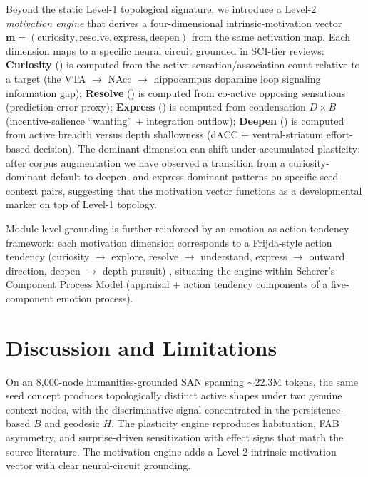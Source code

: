 \documentclass{article}
\begin{document}
Beyond the static Level-1 topological signature, we introduce a Level-2
\emph{motivation engine} that derives a four-dimensional intrinsic-motivation
vector $\mathbf{m} = (\mathrm{curiosity}, \mathrm{resolve},
\mathrm{express}, \mathrm{deepen})$ from the same activation map. Each
dimension maps to a specific neural circuit grounded in SCI-tier reviews:
\textbf{Curiosity} (\cite{gruber2014states,berlyne1960conflict}) is computed
from the active sensation/association count relative to a target (the VTA
$\to$ NAcc $\to$ hippocampus dopamine loop signaling information gap);
\textbf{Resolve} (\cite{schultz2016dopamine,friston2010free}) is computed
from co-active opposing sensations (prediction-error proxy);
\textbf{Express} (\cite{berridge2025incentive,tononi2008qualia}) is computed
from condensation $D \times B$ (incentive-salience ``wanting'' + integration
outflow); \textbf{Deepen}
(\cite{husain2018neuroscience,costello2024apathy}) is computed from active
breadth versus depth shallowness (dACC + ventral-striatum effort-based
decision). The dominant dimension can shift under accumulated plasticity:
after corpus augmentation we have observed a transition from a curiosity-
dominant default to deepen- and express-dominant patterns on specific
seed-context pairs, suggesting that the motivation vector functions as a
developmental marker on top of Level-1 topology.

Module-level grounding is further reinforced by an
emotion-as-action-tendency framework: each motivation dimension corresponds
to a Frijda-style action tendency (curiosity $\to$ explore, resolve $\to$
understand, express $\to$ outward direction, deepen $\to$ depth pursuit)
\cite{frijda1986,scherer2001appraisal}, situating the engine within Scherer's
Component Process Model (appraisal + action tendency components of a five-
component emotion process).

\section{Discussion and Limitations}
On an 8{,}000-node humanities-grounded SAN spanning $\sim$22.3M tokens, the
same seed concept produces topologically distinct active shapes under two
genuine context nodes, with the discriminative signal concentrated in the
persistence-based $B$ and geodesic $H$. The plasticity engine reproduces
habituation, FAB asymmetry, and surprise-driven sensitization with effect
signs that match the source literature. The motivation engine adds a Level-2
intrinsic-motivation vector with clear neural-circuit grounding.
\end{document}
